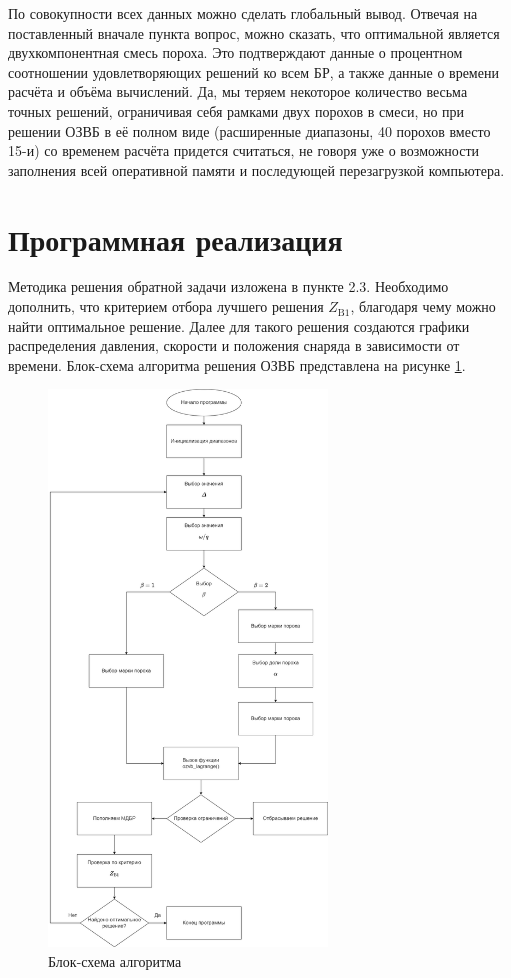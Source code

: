 \documentclass[14pt, a4paper]{extreport} %
\begin{document}
По совокупности всех данных можно сделать глобальный вывод. Отвечая на поставленный вначале пункта вопрос, можно сказать, что оптимальной является двухкомпонентная смесь пороха. Это подтверждают данные о процентном соотношении удовлетворяющих решений ко всем БР, а также данные 
о времени расчёта и объёма вычислений. Да, мы теряем некоторое количество весьма точных решений, ограничивая себя рамками двух порохов в смеси, но при решении ОЗВБ в её полном виде (расширенные диапазоны, 40 порохов вместо 15-и) со временем расчёта придется считаться, не говоря уже о возможности 
заполнения всей оперативной памяти и последующей перезагрузкой компьютера.

\section{Программная реализация}

Методика решения обратной задачи изложена в пункте 2.3. Необходимо дополнить, что критерием отбора лучшего решения $Z_\text{B1}$, благодаря чему можно найти оптимальное решение. Далее для такого решения создаются графики распределения давления, скорости и положения снаряда в зависимости от времени. Блок-схема алгоритма решения ОЗВБ представлена на рисунке  \ref{fig:algo}.

\begin{figure}[H]
\centering
\includegraphics[width=0.66\textwidth]{imgs/algo.png}
\caption{Блок-схема алгоритма}
\label{fig:algo}
\end{figure}
\end{document}
